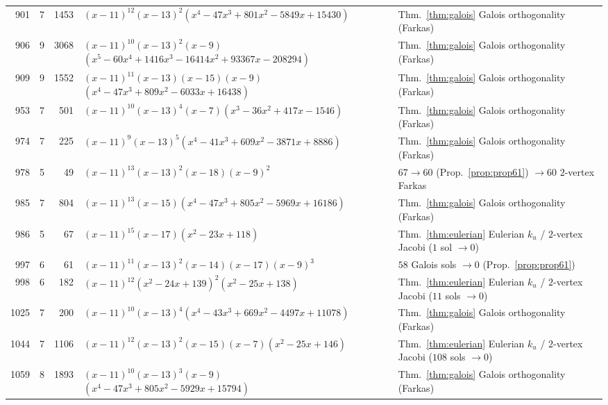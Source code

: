 \documentclass[11pt,reqno]{amsart}
\theoremstyle{definition}
\theoremstyle{remark}
\numberwithin{equation}{section}
\numberwithin{table}{section}
\begin{document}
{\begin{longtable}{@{}rrr>{\raggedright\arraybackslash}p{2.45in}>{\raggedright\arraybackslash}p{2.35in}@{}}
901 & 7 & 1453 & $(x-11)^{12}$\allowbreak $(x-13)^2$\allowbreak $(x^4-47x^3+801x^2-5849x+15430)$ & Thm.~\ref{thm:galois} Galois orthogonality (Farkas) \\
906 & 9 & 3068 & $(x-11)^{10}$\allowbreak $(x-13)^2$\allowbreak $(x-9)$\allowbreak $(x^5-60x^4+1416x^3-16414x^2+93367x-208294)$ & Thm.~\ref{thm:galois} Galois orthogonality (Farkas) \\
909 & 9 & 1552 & $(x-11)^{11}$\allowbreak $(x-13)$\allowbreak $(x-15)$\allowbreak $(x-9)$\allowbreak $(x^4-47x^3+809x^2-6033x+16438)$ & Thm.~\ref{thm:galois} Galois orthogonality (Farkas) \\
953 & 7 & 501 & $(x-11)^{10}$\allowbreak $(x-13)^4$\allowbreak $(x-7)$\allowbreak $(x^3-36x^2+417x-1546)$ & Thm.~\ref{thm:galois} Galois orthogonality (Farkas) \\
974 & 7 & 225 & $(x-11)^9$\allowbreak $(x-13)^5$\allowbreak $(x^4-41x^3+609x^2-3871x+8886)$ & Thm.~\ref{thm:galois} Galois orthogonality (Farkas) \\
978 & 5 & 49 & $(x-11)^{13}$\allowbreak $(x-13)^2$\allowbreak $(x-18)$\allowbreak $(x-9)^2$ & $67 \to 60$ (Prop.~\ref{prop:prop61}) $\to 60$ $2$-vertex Farkas \\
985 & 7 & 804 & $(x-11)^{13}$\allowbreak $(x-15)$\allowbreak $(x^4-47x^3+805x^2-5969x+16186)$ & Thm.~\ref{thm:galois} Galois orthogonality (Farkas) \\
986 & 5 & 67 & $(x-11)^{15}$\allowbreak $(x-17)$\allowbreak $(x^2-23x+118)$ & Thm.~\ref{thm:eulerian} Eulerian $k_u$ / $2$-vertex Jacobi ($1$ sol $\to 0$) \\
997 & 6 & 61 & $(x-11)^{11}$\allowbreak $(x-13)^2$\allowbreak $(x-14)$\allowbreak $(x-17)$\allowbreak $(x-9)^3$ & $58$ Galois sols $\to 0$ (Prop.~\ref{prop:prop61}) \\
998 & 6 & 182 & $(x-11)^{12}$\allowbreak $(x^2-24x+139)^2$\allowbreak $(x^2-25x+138)$ & Thm.~\ref{thm:eulerian} Eulerian $k_u$ / $2$-vertex Jacobi ($11$ sols $\to 0$) \\
1025 & 7 & 200 & $(x-11)^{10}$\allowbreak $(x-13)^4$\allowbreak $(x^4-43x^3+669x^2-4497x+11078)$ & Thm.~\ref{thm:galois} Galois orthogonality (Farkas) \\
1044 & 7 & 1106 & $(x-11)^{12}$\allowbreak $(x-13)^2$\allowbreak $(x-15)$\allowbreak $(x-7)$\allowbreak $(x^2-25x+146)$ & Thm.~\ref{thm:eulerian} Eulerian $k_u$ / $2$-vertex Jacobi ($108$ sols $\to 0$) \\
1059 & 8 & 1893 & $(x-11)^{10}$\allowbreak $(x-13)^3$\allowbreak $(x-9)$\allowbreak $(x^4-47x^3+805x^2-5929x+15794)$ & Thm.~\ref{thm:galois} Galois orthogonality (Farkas) \\

\end{longtable}}
\end{document}
